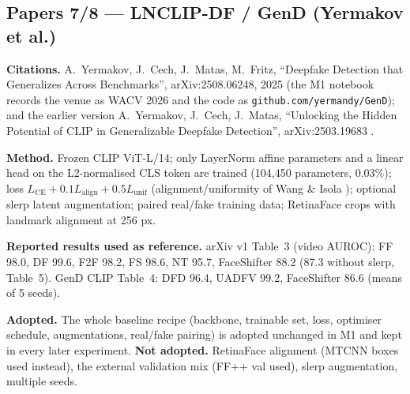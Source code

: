 \documentclass[10pt,a4paper]{article}
\begin{document}
\subsection{Papers 7/8 --- LNCLIP-DF / GenD (Yermakov et al.)}
\textbf{Citations.} A.~Yermakov, J.~Cech, J.~Matas, M.~Fritz, ``Deepfake Detection that Generalizes
Across Benchmarks'', arXiv:2508.06248, 2025 \cite{yermakov2025lnclip} (the M1 notebook records the
venue as WACV 2026 and the code as \texttt{github.com/yermandy/GenD}); and the earlier version
A.~Yermakov, J.~Cech, J.~Matas, ``Unlocking the Hidden Potential of CLIP in Generalizable Deepfake
Detection'', arXiv:2503.19683 \cite{yermakov2025unlocking}.

\textbf{Method.} Frozen CLIP ViT-L/14; only LayerNorm affine parameters and a linear head on the
L2-normalised CLS token are trained (104,450 parameters, 0.03\%); loss
\(L_\text{CE}+0.1L_\text{align}+0.5L_\text{unif}\) (alignment/uniformity of Wang \& Isola
\cite{wang2020alignment}); optional slerp latent augmentation; paired real/fake training data;
RetinaFace crops with landmark alignment at 256 px.

\textbf{Reported results used as reference.} arXiv v1 Table~3 (video AUROC): FF 98.0, DF 99.6, F2F
98.2, FS 98.6, NT 95.7, FaceShifter 88.2 (87.3 without slerp, Table~5). GenD CLIP Table~4: DFD
96.4, UADFV 99.2, FaceShifter 86.6 (means of 5 seeds).

\textbf{Adopted.} The whole baseline recipe (backbone, trainable set, loss, optimiser schedule,
augmentations, real/fake pairing) is adopted unchanged in M1 and kept in every later experiment.
\textbf{Not adopted.} RetinaFace alignment (MTCNN boxes used instead), the external validation mix
(FF++ val used), slerp augmentation, multiple seeds.
\end{document}
